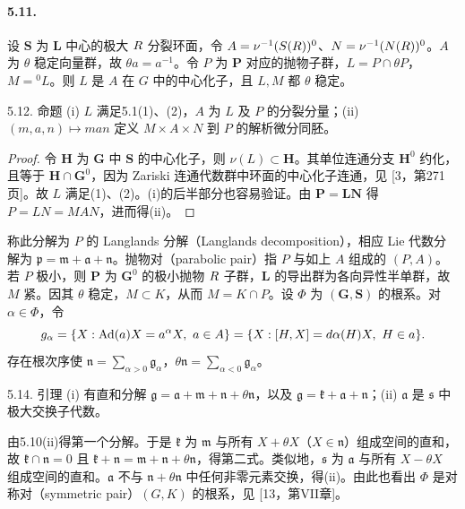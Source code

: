 \paragraph*{5.11.} 设 $\mathbf S$ 为 $\mathbf L$ 中心的极大 $R$ 分裂环面，令 $A=\nu^{-1}(S(R))^0$、$N=\nu^{-1}(N(R))^0$。$A$ 为 $\theta$ 稳定向量群，故 $\theta a=a^{-1}$。令 $P$ 为 $\mathbf P$ 对应的抛物子群，$L=P\cap\theta P$，$M={}^0L$。则 $L$ 是 $A$ 在 $G$ 中的中心化子，且 $L,M$ 都 $\theta$ 稳定。
\begin{originaltheorem}{5.12. 命题}
(i) $L$ 满足5.1(1)、(2)，$A$ 为 $L$ 及 $P$ 的分裂分量；(ii) $(m,a,n)\mapsto man$ 定义 $M\times A\times N$ 到 $P$ 的解析微分同胚。
\end{originaltheorem}
\begin{proof}
令 $\mathbf H$ 为 $\mathbf G$ 中 $\mathbf S$ 的中心化子，则 $\nu(L)\subset\mathbf H$。其单位连通分支 $\mathbf H^0$ 约化，且等于 $\mathbf H\cap\mathbf G^0$，因为 Zariski 连通代数群中环面的中心化子连通，见 [3，第271页]。故 $L$ 满足(1)、(2)。(i)的后半部分也容易验证。由 $\mathbf P=\mathbf L\mathbf N$ 得 $P=LN=MAN$，进而得(ii)。
\end{proof}
称此分解为 $P$ 的 Langlands 分解（Langlands decomposition），相应 Lie 代数分解为 $\mathfrak p=\mathfrak m+\mathfrak a+\mathfrak n$。抛物对（parabolic pair）指 $P$ 与如上 $A$ 组成的 $(P,A)$。
若 $P$ 极小，则 $\mathbf P$ 为 $\mathbf G^0$ 的极小抛物 $R$ 子群，$\mathbf L$ 的导出群为各向异性半单群，故 $M$ 紧。因其 $\theta$ 稳定，$M\subset K$，从而 $M=K\cap P$。设 $\Phi$ 为 $(\mathbf G,\mathbf S)$ 的根系。对 $\alpha\in\Phi$，令
\[
 \mathfrak g_\alpha=\{X:\Ad(a)X=a^\alpha X,\ a\in A\}
 =\{X:[H,X]=d\alpha(H)X,\ H\in\mathfrak a\}.
\]
存在根次序使 $\mathfrak n=\sum_{\alpha>0}\mathfrak g_\alpha$，$\theta\mathfrak n=\sum_{\alpha<0}\mathfrak g_\alpha$。
\begin{originaltheorem}{5.14. 引理}
(i) 有直和分解 $\mathfrak g=\mathfrak a+\mathfrak m+\mathfrak n+\theta\mathfrak n$，以及 $\mathfrak g=\mathfrak k+\mathfrak a+\mathfrak n$；(ii) $\mathfrak a$ 是 $\mathfrak s$ 中极大交换子代数。
\end{originaltheorem}
由5.10(ii)得第一个分解。于是 $\mathfrak k$ 为 $\mathfrak m$ 与所有 $X+\theta X$（$X\in\mathfrak n$）组成空间的直和，故 $\mathfrak k\cap\mathfrak n=0$ 且 $\mathfrak k+\mathfrak n=\mathfrak m+\mathfrak n+\theta\mathfrak n$，得第二式。类似地，$\mathfrak s$ 为 $\mathfrak a$ 与所有 $X-\theta X$ 组成空间的直和。$\mathfrak a$ 不与 $\mathfrak n+\theta\mathfrak n$ 中任何非零元素交换，得(ii)。由此也看出 $\Phi$ 是对称对（symmetric pair）$(G,K)$ 的根系，见 [13，第VII章]。
